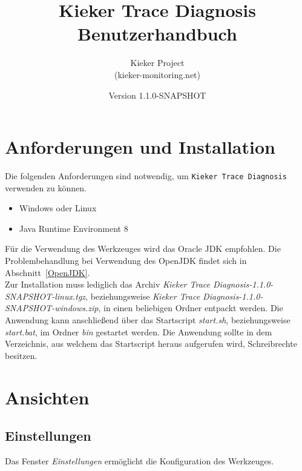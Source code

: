 \documentclass{article}
\begin{document}
  \newcommand{\version}[0]{1.1.0-SNAPSHOT}
  \newcommand{\KiekerTraceDiagnosis}[0]{\texttt{Kieker Trace Diagnosis}}
  \newcommand{\file}[1]{\textit{#1}}

  \title{Kieker Trace Diagnosis\\Benutzerhandbuch}
  \date{Version \version{}}
  \author{Kieker Project\\(kieker-monitoring.net)}

  \maketitle

  \section{Anforderungen und Installation}
  Die folgenden Anforderungen sind notwendig, um \KiekerTraceDiagnosis{} verwenden zu können.
  \begin{itemize}
    \item Windows oder Linux
    \item Java Runtime Environment 8
  \end{itemize}
  Für die Verwendung des Werkzeuges wird das Oracle JDK empfohlen. Die Problembehandlung bei Verwendung des OpenJDK findet sich in Abschnitt~\ref{OpenJDK}.\\

  Zur Installation muss lediglich das Archiv \file{Kieker Trace Diagnosis-\version{}-linux.tgz}, beziehungsweise \file{Kieker Trace Diagnosis-\version{}-windows.zip}, in einen beliebigen Ordner entpackt werden.
  Die Anwendung kann anschließend über das Startscript \file{start.sh}, beziehungsweise \file{start.bat}, im Ordner \file{bin} gestartet werden.
  Die Anwendung sollte in dem Verzeichnis, aus welchem das Startscript heraus aufgerufen wird, Schreibrechte besitzen.

  \section{Ansichten}

  \subsection{Einstellungen}

  Das Fenster \textit{Einstellungen} ermöglicht die Konfiguration des Werkzeuges.
\end{document}
